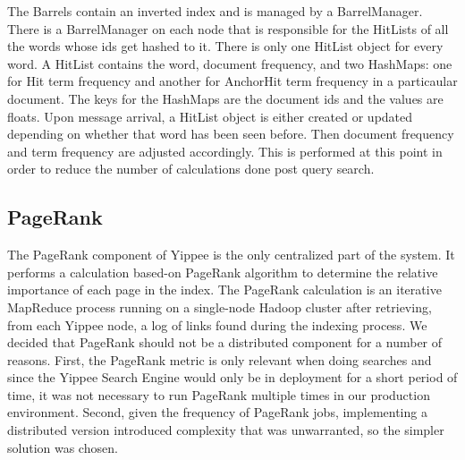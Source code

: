 \documentclass[11pt, letterpaper, oneside, twocolumn]{article}
\begin{document}
The Barrels contain an inverted index and is managed by a BarrelManager. 
There is a BarrelManager on each node that is responsible for the HitLists of all the words whose ids get hashed to it. There is only one HitList object for every word. 
A HitList contains the word, document frequency, and two HashMaps: one for Hit term frequency and another for AnchorHit term frequency in a particaular document. 
The keys for the HashMaps are the document ids and the values are floats. 
Upon message arrival, a HitList object is either created or updated depending on whether that word has been seen before. 
Then document frequency and term frequency are adjusted accordingly. 
This is performed at this point in order to reduce the number of calculations done post query search.  

\subsection{PageRank}

The PageRank component of Yippee is the only centralized part of the system.
It performs a calculation based-on PageRank algorithm\cite{pagerank} to determine the relative importance of each page in the index.
The PageRank calculation is an iterative MapReduce process running on a single-node Hadoop cluster after retrieving, from each Yippee node, a log of links found during the indexing process.
We decided that PageRank should not be a distributed component for a number of  reasons. 
First, the PageRank metric is only relevant when doing searches and since the Yippee Search Engine would only be in deployment for a short period of time, it was not necessary to run PageRank multiple times in our production environment.
Second, given the frequency of PageRank jobs, implementing a distributed version introduced complexity that was unwarranted, so the simpler solution was chosen.
\end{document}
